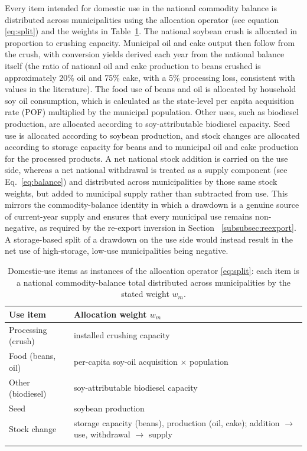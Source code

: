 \documentclass[pdflatex,sn-nature]{sn-jnl}%
\begin{document}
Every item intended for domestic use in the national commodity balance is distributed across municipalities using the allocation operator (see equation \eqref{eq:split}) and the weights in Table~\ref{tab:weights}. The national soybean crush is allocated in proportion to crushing capacity. Municipal oil and cake output then follow from the crush, with conversion yields derived each year from the national balance itself (the ratio of national oil and cake production to beans crushed is approximately 20\% oil and 75\% cake, with a 5\% processing loss, consistent with values in the literature). The food use of beans and oil is allocated by household soy oil consumption, which is calculated as the state-level per capita acquisition rate (POF) multiplied by the municipal population. Other uses, such as biodiesel production, are allocated according to soy-attributable biodiesel capacity. Seed use is allocated according to soybean production, and stock changes are allocated according to storage capacity for beans and to municipal oil and cake production for the processed products. A net national stock addition is carried on the use side, whereas a net national withdrawal is treated as a supply component (see Eq.~\ref{eq:balance}) and distributed across municipalities by those same stock weights, but added to municipal supply rather than subtracted from use. This mirrors the commodity-balance identity in which a drawdown is a genuine source of current-year supply and ensures that every municipal use remains non-negative, as required by the re-export inversion in Section ~\ref{subsubsec:reexport}. A storage-based split of a drawdown on the use side would instead result in the net use of high-storage, low-use municipalities being negative.

\begin{table}[htbp]
\small
\caption{Domestic-use items as instances of the allocation operator
\eqref{eq:split}: each item is a national commodity-balance total distributed
across municipalities by the stated weight $w_m$.}\label{tab:weights}
\begin{tabular}{@{}ll@{}}
\toprule
Use item & Allocation weight $w_m$ \\
\midrule
Processing (crush)  & installed crushing capacity \\
Food (beans, oil)   & per-capita soy-oil acquisition $\times$ population \\
Other (biodiesel)   & soy-attributable biodiesel capacity \\
Seed                & soybean production \\
Stock change        & storage capacity (beans), production (oil, cake); addition $\to$ use, withdrawal $\to$ supply \\
\botrule
\end{tabular}
\end{table}
\end{document}
